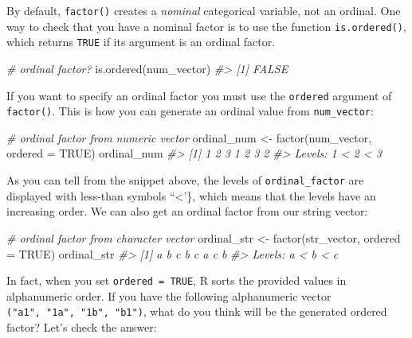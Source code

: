 \documentclass[
]{book}
\newenvironment{Shaded}{\begin{snugshade}}{\end{snugshade}}
\newcommand{\AttributeTok}[1]{\textcolor[rgb]{0.77,0.63,0.00}{#1}}
\newcommand{\CommentTok}[1]{\textcolor[rgb]{0.56,0.35,0.01}{\textit{#1}}}
\newcommand{\ConstantTok}[1]{\textcolor[rgb]{0.00,0.00,0.00}{#1}}
\newcommand{\FunctionTok}[1]{\textcolor[rgb]{0.00,0.00,0.00}{#1}}
\newcommand{\NormalTok}[1]{#1}
\newcommand{\OtherTok}[1]{\textcolor[rgb]{0.56,0.35,0.01}{#1}}
\begin{document}
By default, \texttt{factor()} creates a \emph{nominal} categorical variable, not an ordinal.
One way to check that you have a nominal factor is to use the function
\texttt{is.ordered()}, which returns \texttt{TRUE} if its argument is an ordinal factor.

\begin{Shaded}
\begin{Highlighting}[]
\CommentTok{\# ordinal factor?}
\FunctionTok{is.ordered}\NormalTok{(num\_vector)}
\CommentTok{\#\textgreater{} [1] FALSE}
\end{Highlighting}
\end{Shaded}

If you want to specify an ordinal factor you must use the \texttt{ordered} argument of
\texttt{factor()}. This is how you can generate an ordinal value from \texttt{num\_vector}:

\begin{Shaded}
\begin{Highlighting}[]
\CommentTok{\# ordinal factor from numeric vector}
\NormalTok{ordinal\_num }\OtherTok{\textless{}{-}} \FunctionTok{factor}\NormalTok{(num\_vector, }\AttributeTok{ordered =} \ConstantTok{TRUE}\NormalTok{)}
\NormalTok{ordinal\_num}
\CommentTok{\#\textgreater{} [1] 1 2 3 1 2 3 2}
\CommentTok{\#\textgreater{} Levels: 1 \textless{} 2 \textless{} 3}
\end{Highlighting}
\end{Shaded}

As you can tell from the snippet above, the levels of \texttt{ordinal\_factor} are
displayed with less-than symbols ``\textless{}'\}, which means that the levels have an
increasing order. We can also get an ordinal factor from our string vector:

\begin{Shaded}
\begin{Highlighting}[]
\CommentTok{\# ordinal factor from character vector}
\NormalTok{ordinal\_str }\OtherTok{\textless{}{-}} \FunctionTok{factor}\NormalTok{(str\_vector, }\AttributeTok{ordered =} \ConstantTok{TRUE}\NormalTok{)}
\NormalTok{ordinal\_str}
\CommentTok{\#\textgreater{} [1] a b c b c a c b}
\CommentTok{\#\textgreater{} Levels: a \textless{} b \textless{} c}
\end{Highlighting}
\end{Shaded}

In fact, when you set \texttt{ordered\ =\ TRUE}, R sorts the provided values in
alphanumeric order. If you have the following alphanumeric vector
\texttt{("a1",\ "1a",\ "1b",\ "b1")}, what do you think will be the generated ordered
factor? Let's check the answer:
\end{document}

